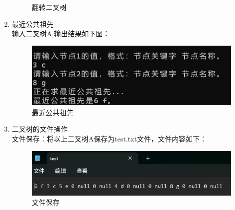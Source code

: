 \documentclass[supercite]{Experimental_Report}
\theoremstyle{definition}
\begin{document}
\begin{enumerate}
\begin{figure}[htbp]
\begin{minipage}{0.7\linewidth}
		\end{minipage}
		\caption{翻转二叉树}
		\label{fig2-25}
	\end{figure}
	\newpage
	\item 最近公共祖先\\
		输入二叉树A,输出结果如下图：
		\begin{figure}[htbp]
			\centering
			\begin{minipage}{0.7\linewidth}
				\centering
				\includegraphics[width=0.9\linewidth]{images/求lca成功.png}
			\end{minipage}
			\caption{ 最近公共祖先}
			\label{fig2-26}
		\end{figure}

		\newpage
		
\item 二叉树的文件操作\\
文件保存：将以上二叉树A保存为test.txt文件，文件内容如下：
\begin{figure}[htbp]
	\centering
	\begin{minipage}{0.7\linewidth}
		\centering
		\includegraphics[width=0.9\linewidth]{images/二叉树文件保存.png}
	\end{minipage}
	\caption{文件保存}
	\label{fig2-27}
\end{figure}


\end{enumerate}
\end{document}
